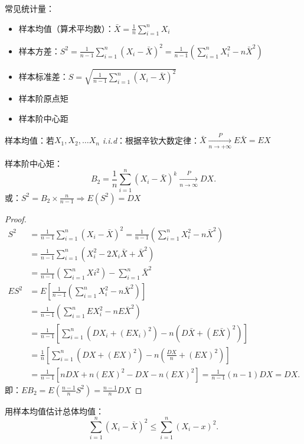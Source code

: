 常见统计量：
\begin{itemize}
    \item 样本均值（算术平均数）：$\bar{X}=\frac{1}{n} \sum_{i=1}^{n} X_{i}$
    \item 样本方差：$S^2=\frac{1}{n-1} \sum_{i=1}^{n} \left( X_{i}-\bar{X} \right) ^2=\frac{1}{n-1} \left( \sum_{i=1}^{n} X_{i}^2-n\bar{X}^2 \right) $
    \item 样本标准差：$S=\sqrt{\frac{1}{n-1} \sum_{i=1}^{n} \left( X_{i}-\bar{X} \right) ^2} $
    \item 样本阶原点矩
    \item 样本阶中心距
\end{itemize}
\begin{notation}
    样本均值：若$X_1,X_2,\ldots X_{n}$ \textit{i.i.d}：根据辛钦大数定律：$\bar{X}\xrightarrow[n \to +\infty]{P} E\bar{X}=EX$
\end{notation}
\begin{notation}
    样本阶中心矩：
     \[
        B_2=\frac{1}{n} \sum_{i=1}^{n} \left( X_{i}-\bar{X} \right) ^{k}\xrightarrow[n\to \infty]{P} DX
    .\] 
    或：$S^2=B_2\times \frac{n}{n-1} \Rightarrow E\left( S^2 \right) =DX$
\end{notation}
\begin{proof}
    \begin{align*}
        S^2&=\frac{1}{n-1} \sum_{i=1}^{n} \left( X_{i}-\bar{X} \right) ^2=\frac{1}{n-1} \left( \sum_{i=1}^{n} X_{i}^2-n\bar{X}^2 \right) \\
        &= \frac{1}{n-1} \sum_{i=1}^{n} \left( X_{i}^2-2X_{i}\bar{X}+\bar{X}^2 \right) \\
        &= \frac{1}{n-1} \left( \sum_{i=1}^{n} Xi^2 \right) -\sum_{i=1}^{n} \bar{X}^2 \\
        ES^2&= E\left[ \frac{1}{n-1} \left( \sum_{i=1}^{n} X_{i}^2-n\bar{X}^2 \right)  \right]  \\
        &= \frac{1}{n-1} \left( \sum_{i=1}^{n} EX_{i}^2-nE\bar{X}^2 \right)  \\
        &= \frac{1}{n-1} \left[ \sum_{i=1}^{n} \left( DX_{i}+\left( EX_{i} \right) ^2 \right) -n\left( D\bar{X}+\left( E\bar{X} \right) ^2   \right)  \right]  \\
        &= \frac{1}{n} \left[ \sum_{i=1}^{n} \left( DX+\left( EX \right) ^2 \right) -n\left( \frac{DX}{n} +\left( EX \right) ^2 \right)  \right]  \\
        &= \frac{1}{n-1} \left[ nDX+n\left( EX \right) ^2-DX-n\left( EX \right) ^2 \right] =\frac{1}{n-1} \left( n-1 \right) DX =DX
    .\end{align*}
    即：$EB_2=E\left( \frac{n-1}{n} S^2 \right) =\frac{n-1}{n}DX $
\end{proof}
用样本均值估计总体均值：
\[
    \sum_{i=1}^{n} \left( X_{i}-\bar{X} \right) ^2\le \sum_{i=1}^{n} \left( X_{i}-x \right) ^2
.\] 
